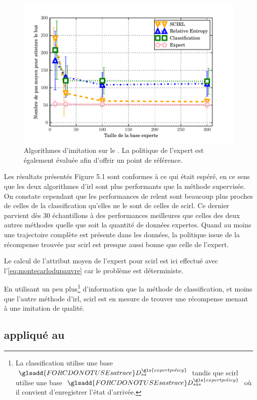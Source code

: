 \documentclass[frenchb,a4paper,justified,notoc]{tufte-book}
\newcommand{\expertpolicy}{\gls{expertpolicy}}
\newcommand{\satrace}[1]{\ensuremath{\glsadd{FORCDONOTUSEsatrace}D_{sa}^{#1}}}
\newcommand{\sastrace}[1]{\ensuremath{\glsadd{FORCDONOTUSEsastrace}D_{sas}^{#1}}}
\begin{document}
\begin{figure}
\centering
\includegraphics[width=\textwidth]{Figures/mountain_car_scirl.pdf}
\caption[Algorithmes d'imitation sur le ]{Algorithmes d'imitation sur le . La politique de l'expert est également évaluée afin d'offrir un point de référence.}
\label{fig:scirlmountaincar}
\end{figure}

Les résultats présentés Figure 5.1
 sont conformes à ce qui était espéré, en ce sens que les deux algorithmes d'\gls{irl} sont plus performants que la méthode supervisée. On constate cependant que les performances de \gls{relent} sont beaucoup plus proches de celles de la classification qu'elles ne le sont de celles de \gls{scirl}. Ce dernier parvient dès $30$ échantillons à des performances meilleures que celles des deux autres méthodes quelle que soit la quantité de données expertes. Quand au moins une trajectoire complète est présente dans les données, la politique issue de la récompense trouvée par \gls{scirl} est presque aussi bonne que celle de l'expert.
    
Le calcul de l'attribut moyen de l'expert pour \gls{scirl} est ici effectué avec l'\autoref{eq:montecarlodupauvre} car le problème est déterministe.
    
En utilisant un peu plus\footnote{La classification utilise une base $\satrace{\expertpolicy}$ tandis que \gls{scirl} utilise une base $\sastrace{\expertpolicy}$ où il convient d'enregistrer l'état d'arrivée.
 } d'information que la méthode de classification, et moins que l'autre méthode d'\gls{irl}, \gls{scirl} est en mesure de trouver une récompense menant à une imitation de qualité.
\subsection{ appliqué au }
\label{sec-5-4-3}
\label{hier-exphighway}
\end{document}
